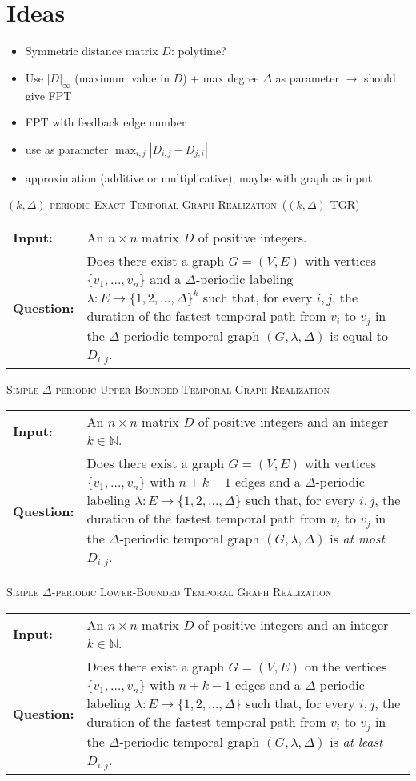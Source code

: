\documentclass[a4paper,UKenglish,cleveref, autoref, thm-restate]{lipics-v2021}
\makeatletter
\newcommand{\problemdef}[3]{
	\begin{center}
		\begin{minipage}{0.95\textwidth}
			\noindent
			#1
			\vspace{5pt}\\
			\setlength{\tabcolsep}{3pt}
			\begin{tabularx}{\textwidth}{@{}lX@{}}
				\textbf{Input:}& #2 \\
				\textbf{Question:}& #3
			\end{tabularx}
		\end{minipage}
	\end{center}
}
\newcommand{\kDeltaExactLong}{\textsc{$(k,\Delta)$-periodic Exact Temporal Graph Realization}}
\newcommand{\kDeltaExact}{\textsc{$(k,\Delta)$-TGR}}
\newcommand{\DeltaUpperBoundLong}{\textsc{Simple $\Delta$-periodic Upper-Bounded Temporal Graph Realization}}
\newcommand{\kDeltaLowerBoundLong}{\textsc{Simple $\Delta$-periodic Lower-Bounded Temporal Graph Realization}}
\makeatother
\begin{document}
\clearpage

\section{Ideas}
\begin{itemize}
    \item Symmetric distance matrix $D$: polytime?
    \item Use $|D|_\infty$ (maximum value in $D$) + max degree $\Delta$ as parameter $\rightarrow$ should give FPT
    \item FPT with feedback edge number
    \item use as parameter $\max_{i,j} |D_{i,j}-D_{j,i}|$
    \item approximation (additive or multiplicative), maybe with graph as input
\end{itemize}

\problemdef{\kDeltaExactLong\ (\kDeltaExact)}
{An $n \times n$ matrix $D$ of positive integers.}
{Does there exist a graph $G=(V,E)$ with vertices $\{v_1,\ldots,v_{n}\}$ 
and a $\Delta$-periodic labeling $\lambda: E \rightarrow \{1,2,\ldots,\Delta\}^k$ such that, 
for every $i,j$, the duration of the fastest temporal path from $v_i$ to $v_j$ in the $\Delta$-periodic temporal graph $(G,\lambda,\Delta)$ is equal to $D_{i,j}$.}

\problemdef{\DeltaUpperBoundLong}
{An $n \times n$ matrix $D$ of positive integers and an integer $k\in \mathbb{N}$.}
{Does there exist a graph $G=(V,E)$ with vertices $\{v_1,\ldots,v_{n}\}$ with $n+k-1$ edges 
	and a $\Delta$-periodic labeling $\lambda: E \rightarrow \{1,2,\ldots,\Delta\}$ such that, 
	for every $i,j$, the duration of the fastest temporal path from $v_i$ to $v_j$ in the $\Delta$-periodic temporal graph $(G,\lambda,\Delta)$ is \emph{at most} $D_{i,j}$.}

\problemdef{\kDeltaLowerBoundLong}
{An $n \times n$ matrix $D$ of positive integers and an integer $k\in \mathbb{N}$.}
{Does there exist a graph $G=(V,E)$ on the vertices $\{v_1,\ldots,v_{n}\}$ with $n+k-1$ edges 
and a $\Delta$-periodic labeling $\lambda: E \rightarrow \{1,2,\ldots,\Delta\}$ such that, 
for every $i,j$, the duration of the fastest temporal path from $v_i$ to $v_j$ in the $\Delta$-periodic temporal graph $(G,\lambda,\Delta)$ is \emph{at least} $D_{i,j}$.}

\end{document}
